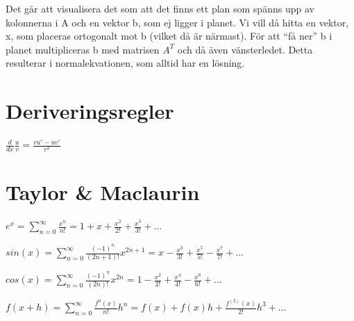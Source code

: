 \documentclass[12pt,a4paper]{article}
\begin{document}
Det går att visualisera det som att det finns ett plan som spänns upp av kolonnerna i A och en vektor b, som ej ligger i planet. Vi vill då hitta en vektor, x, som placeras ortogonalt mot b (vilket då är närmast). För att ``få ner'' b i planet multipliceras b med matrisen $A^T$ och då även vänsterledet. Detta resulterar i normalekvationen, som alltid har en lösning.

\section{Deriveringsregler}
$\frac{d}{dx}\frac{u}{v} = \frac{vu'-uv'}{v^2}$

\section{Taylor \& Maclaurin}

\LARGE
$ e^x = \sum_{n=0}^{\infty} \frac{x^n}{n!} = 1 + x + \frac{x^2}{2!} + \frac{x^3}{3!} + \ldots $

$ sin(x) = \sum_{n=0}^{\infty} \frac{(-1)^n}{(2n+1)!} x^{2n+1} = x - \frac{x^3}{3!} + \frac{x^5}{5!} - \frac{x^7}{7!} + \ldots$

$ cos(x) = \sum_{n=0}^{\infty} \frac{(-1)^n}{(2n)!} x^{2n} = 1 - \frac{x^2}{2!} + \frac{x^4}{4!} - \frac{x^6}{6!} + \ldots$

$ f(x+h) = \sum_{n=0}^{\infty} \frac{f^n(x)}{n!}h^n = f(x) + f(x)h + \frac{f^{(2)}(x)}{2!}h^3 + \ldots $
\end{document}
